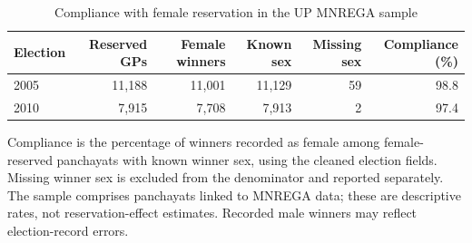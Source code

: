 \begin{table}[!h]
\centering
\caption{\label{tab:up-reservation-compliance}Compliance with female reservation in the UP MNREGA sample}
\centering
\fontsize{9}{11}\selectfont
\begin{threeparttable}
\begin{tabular}[t]{lrrrrr}
\toprule
Election & Reserved GPs & Female winners & Known sex & Missing sex & Compliance (\%)\\
\midrule
2005 & 11,188 & 11,001 & 11,129 & 59 & 98.8\\
2010 & 7,915 & 7,708 & 7,913 & 2 & 97.4\\
\bottomrule
\end{tabular}
\begin{tablenotes}
\item Compliance is the percentage of winners recorded as female among female-reserved panchayats with known winner sex, using the cleaned election fields. Missing winner sex is excluded from the denominator and reported separately. The sample comprises panchayats linked to MNREGA data; these are descriptive rates, not reservation-effect estimates. Recorded male winners may reflect election-record errors.
\end{tablenotes}
\end{threeparttable}
\end{table}
